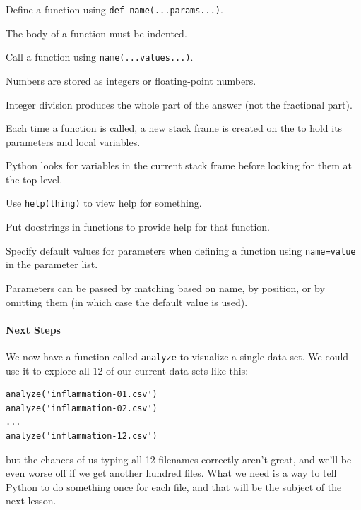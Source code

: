 \documentclass{book}
\begin{document}
\begin{keypoints}
\begin{swcitemize}
\item
  Define a function using \texttt{def name(...params...)}.
\item
  The body of a function must be indented.
\item
  Call a function using \texttt{name(...values...)}.
\item
  Numbers are stored as integers or floating-point numbers.
\item
  Integer division produces the whole part of the answer (not the
  fractional part).
\item
  Each time a function is called, a new stack frame is created on the
   to hold its parameters and local
  variables.
\item
  Python looks for variables in the current stack frame before looking
  for them at the top level.
\item
  Use \texttt{help(thing)} to view help for something.
\item
  Put docstrings in functions to provide help for that function.
\item
  Specify default values for parameters when defining a function using
  \texttt{name=value} in the parameter list.
\item
  Parameters can be passed by matching based on name, by position, or by
  omitting them (in which case the default value is used).
\end{swcitemize}
\end{keypoints}

\mbox{}\paragraph{Next Steps}

We now have a function called \texttt{analyze} to visualize a single
data set. We could use it to explore all 12 of our current data sets
like this:

\begin{verbatim}
analyze('inflammation-01.csv')
analyze('inflammation-02.csv')
...
analyze('inflammation-12.csv')
\end{verbatim}

but the chances of us typing all 12 filenames correctly aren't great,
and we'll be even worse off if we get another hundred files. What we
need is a way to tell Python to do something once for each file, and
that will be the subject of the next lesson.
\end{document}
